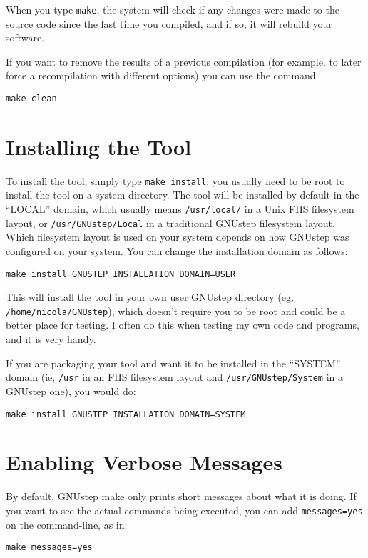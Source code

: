 \documentclass[a4paper]{article}
\begin{document}
When you type \texttt{make}, the system will check if any changes were
made to the source code since the last time you compiled, and if so,
it will rebuild your software.

If you want to remove the results of a previous compilation (for
example, to later force a recompilation with different options) you
can use the command
\begin{verbatim}
make clean
\end{verbatim}

\section{Installing the Tool}
To install the tool, simply type \texttt{make install}; you usually
need to be root to install the tool on a system directory.
The tool will be installed by default in the ``LOCAL'' domain, which
usually means \texttt{/usr/local/} in a Unix FHS filesystem layout, or
\texttt{/usr/GNUstep/Local} in a traditional GNUstep filesystem
layout.  Which filesystem layout is used on your system depends on how
GNUstep was configured on your system.
You can change the installation domain as follows:
\begin{verbatim}
make install GNUSTEP_INSTALLATION_DOMAIN=USER
\end{verbatim}
This will install the tool in your own user GNUstep directory (eg,
\texttt{/home/nicola/GNUstep}), which doesn't require you to be root
and could be a better place for testing.  I often do this when testing
my own code and programs, and it is very handy.

If you are packaging your tool and want it to be installed in the
``SYSTEM'' domain (ie, \texttt{/usr} in an FHS filesystem layout and
\texttt{/usr/GNUstep/System} in a GNUstep one), you would do:
\begin{verbatim}
make install GNUSTEP_INSTALLATION_DOMAIN=SYSTEM
\end{verbatim}

\section{Enabling Verbose Messages}
By default, GNUstep make only prints short messages about what it is
doing.  If you want to see the actual commands being executed, you
can add \texttt{messages=yes} on the command-line, as in:
\begin{verbatim}
make messages=yes
\end{verbatim}
\end{document}
